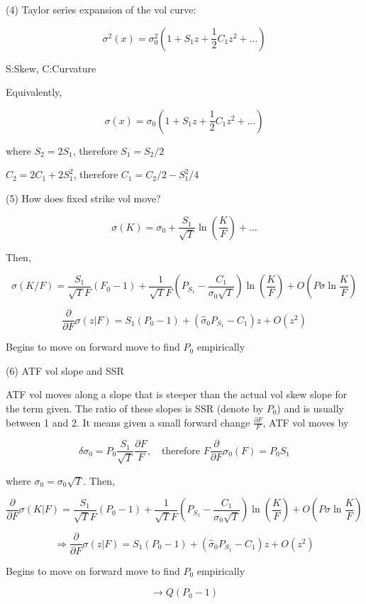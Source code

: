 \documentclass[12pt]{article}
\begin{document}
(4) Taylor series expansion of the vol curve:

\[
\sigma^2(x) = \sigma_0^2\left(1 + S_1 z + \frac{1}{2} C_1 z^2 + \ldots\right)
\]

S:Skew, C:Curvature

Equivalently,

\[
\sigma(x) = \sigma_0\left(1 + S_1 z + \frac{1}{2} C_1 z^2 + \ldots\right)
\]

where \(S_2 = 2S_1\), therefore \(S_1 = S_2/2\)

\(C_2 = 2C_1 + 2S_1^2\), therefore \(C_1 = C_2/2 - S_1^2/4\)

(5) How does fixed strike vol move?

\[
\sigma(K) = \sigma_0 + \frac{S_1}{\sqrt{T}} \ln\left(\frac{K}{F}\right) + \ldots
\]

Then,

\[
{\sigma(K/F)} = \frac{S_1}{\sqrt{T}F} \left(F_0 - 1\right) + \frac{1}{\sqrt{T}F} \left(P_{S_1} - \frac{C_1}{\sigma_0\sqrt{T}}\right) \ln\left(\frac{K}{F}\right) + O(P\sigma\ln\frac{K}{F})
\]

\[
\frac{\partial}{\partial F} \sigma(z|F) = S_1(P_0 - 1) + \left(\hat{\sigma}_0 P_{S_1} - C_1\right) z + O(z^2)
\]

Begins to move on forward move to find \(P_0\) empirically

(6) ATF vol slope and SSR

ATF vol moves along a slope that is steeper than the actual vol skew slope for the term given. The ratio of these slopes is SSR (denote by \(P_0\)) and is usually between 1 and 2. It means given a small forward change \(\frac{\partial F}{F}\), ATF vol moves by

\[
\delta \sigma_0 = P_0 \frac{S_1}{\sqrt{T}} \frac{\partial F}{F}, \quad \text{therefore } F \frac{\partial}{\partial F} \sigma_0(F) = P_0 S_1
\]

where \(\sigma_0 = \sigma_0 \sqrt{T}\). Then,

\[
\frac{\partial}{\partial F} \sigma(K|F) = \frac{S_1}{\sqrt{T}F} \left(P_0 - 1\right) + \frac{1}{\sqrt{T}F} \left(P_{S_1} - \frac{C_1}{\sigma_0\sqrt{T}}\right) \ln\left(\frac{K}{F}\right) + O(P\sigma\ln\frac{K}{F})
\]

\[
\Rightarrow \frac{\partial}{\partial F} \sigma(z|F) = S_1(P_0 - 1) + \left(\hat{\sigma}_0 P_{S_1} - C_1\right) z + O(z^2)
\]

Begins to move on forward move to find \(P_0\) empirically

\[
\rightarrow Q(P_0 - 1)
\]
\end{document}
